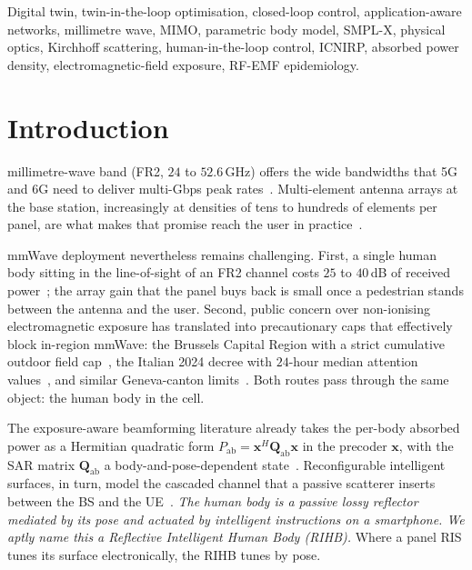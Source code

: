 \documentclass[journal,twocolumn,10pt]{IEEEtran}
\theoremstyle{plain}
\theoremstyle{definition}
\theoremstyle{remark}
\newcommand{\xx}{\mathbf{x}}
\newcommand{\Pabs}{P_{\mathrm{ab}}}
\newcommand{\Qabs}{\mathbf{Q}_{\mathrm{ab}}}
\begin{document}
\begin{IEEEkeywords}
Digital twin, twin-in-the-loop optimisation, closed-loop control,
application-aware networks, millimetre wave, MIMO, parametric body
model, SMPL-X, physical optics, Kirchhoff scattering, human-in-the-loop
control, ICNIRP, absorbed power density, electromagnetic-field
exposure, RF-EMF epidemiology.
\end{IEEEkeywords}

\IEEEpeerreviewmaketitle


\section{Introduction}\label{sec:intro}

 millimetre-wave band (FR2, $24$ to $52.6\,$GHz)
offers the wide bandwidths that 5G and 6G need to deliver multi-Gbps
peak rates~\cite{general5G,TS38214}. Multi-element antenna arrays at
the base station, increasingly at densities of tens to hundreds of
elements per panel, are what makes that promise reach the user in
practice~\cite{HeathLozanoFA2018}.

mmWave deployment nevertheless remains challenging. First, a single
human body sitting in the line-of-sight of an FR2 channel costs $25$
to $40\,$dB of received power~\cite{MacCartney2017,Maccartney2017blockage};
the array gain that the panel buys back is small once a pedestrian
stands between the antenna and the user. Second, public concern over
non-ionising electromagnetic exposure has translated into precautionary
caps that effectively block in-region mmWave: the Brussels Capital
Region with a strict cumulative outdoor field
cap~\cite{BrusselsArrete2007,BrusselsArrete2024}, the Italian 2024
decree with $24$-hour median attention values~\cite{ItalyDL}, and
similar Geneva-canton limits~\cite{SwissNISV2000}. Both routes pass through the
same object: the human body in the cell.

The exposure-aware beamforming literature already takes the per-body
absorbed power as a Hermitian quadratic form
$\Pabs = \xx^{H}\Qabs\xx$ in the precoder $\xx$, with the SAR matrix
$\Qabs$ a body-and-pose-dependent
state~\cite{Hochwald2014,Ying2015,Ying2017}. Reconfigurable intelligent
surfaces, in turn, model the cascaded channel that a passive scatterer
inserts between the BS and the UE~\cite{DiRenzo2020,Wu2019}.
\emph{The human body is a passive lossy reflector mediated by its pose
and actuated by intelligent instructions on a smartphone. We aptly
name this a Reflective Intelligent Human Body (RIHB).} Where a panel
RIS tunes its surface electronically, the RIHB tunes by pose.
\end{document}
